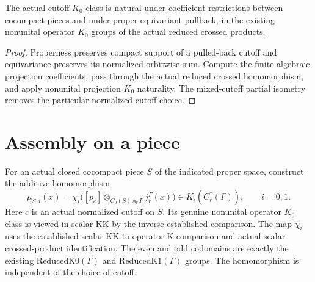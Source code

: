 \begin{proposition}\label{prop:cutoff-crossed-naturality}
\leanok
The actual cutoff $K_0$ class is natural under coefficient restrictions
between cocompact pieces and under proper equivariant pullback, in the
existing nonunital operator $K_0$ groups of the actual reduced crossed
products.
\end{proposition}
\begin{proof}
\leanok
Properness preserves compact support of a pulled-back cutoff and
equivariance preserves its normalized orbitwise sum. Compute the finite
algebraic projection coefficients, pass through the actual reduced crossed
homomorphism, and apply nonunital projection $K_0$ naturality. The mixed-cutoff
partial isometry removes the particular normalized cutoff choice.
\end{proof}


\section{Assembly on a piece}

\begin{definition}\label{def:assembly-piece}
\leanok
For an actual closed cocompact piece $S$ of the indicated proper space,
construct the additive homomorphism
\[
 \mu_{S,i}(x)=\chi_i\bigl([p_c]\otimes_{C_0(S)\rtimes_r\Gamma}j_r^\Gamma(x)\bigr)
       \in K_i(C_r^*(\Gamma)),\qquad i=0,1.
\]
Here $c$ is an actual normalized cutoff on $S$. Its genuine nonunital
operator $K_0$ class is viewed in scalar KK by the inverse established
comparison. The map $\chi_i$ uses the established scalar KK-to-operator-K
comparison and actual scalar crossed-product identification. The even and
odd codomains are exactly the existing $\mathrm{ReducedK0}(\Gamma)$ and
$\mathrm{ReducedK1}(\Gamma)$ groups. The homomorphism is independent of
the choice of cutoff.
\end{definition}


